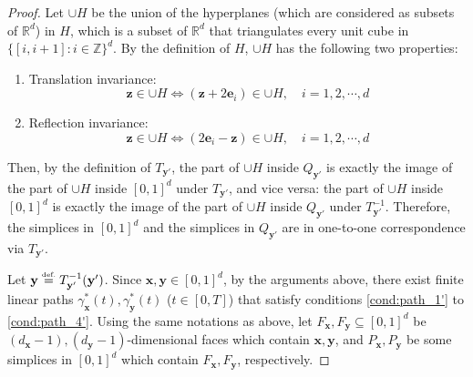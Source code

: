 \documentclass{article}
\numberwithin{equation}{section}
\theoremstyle{definition}
\newcommand{\eqdef}{\ensuremath{\stackrel{\mbox{\upshape\tiny def.}}{=}}}
\begin{document}
\begin{proof}
Let $\cup H$ be the union of the hyperplanes (which are considered as subsets of $\mathbb{R}^d$) in $H$, which is a subset of $\mathbb{R}^d$ that triangulates every unit cube in $\{[i,i+1]: i\in\mathbb{Z}\}^d$. By the definition of $H$, $\cup H$ has the following two properties:
\begin{enumerate}
    \item Translation invariance:
    $$\mathbf{z} \in \cup H \Longleftrightarrow
      (\mathbf{z} + 2\mathbf{e}_i) \in \cup H, 
      \quad i=1,2,\cdots,d$$
    \item Reflection invariance:
    $$\mathbf{z} \in \cup H \Longleftrightarrow
      (2\mathbf{e}_i - \mathbf{z}) \in \cup H,
      \quad i=1,2,\cdots,d$$
\end{enumerate}
Then, by the definition of $T_{\mathbf{y}'}$, the part of $\cup H$ inside $Q_{\mathbf{y}'}$ is exactly the image of the part of $\cup H$ inside $[0,1]^d$ under $T_{\mathbf{y}'}$, and vice versa: the part of $\cup H$ inside $[0,1]^d$ is exactly the image of the part of $\cup H$ inside $Q_{\mathbf{y}'}$ under $T_{\mathbf{y}'}^{-1}$. Therefore, the simplices in $[0,1]^d$ and the simplices in $Q_{\mathbf{y}'}$ are in one-to-one correspondence via $T_{\mathbf{y}'}$.

Let $\mathbf{y}  \eqdef  T_{\mathbf{y}'}^{-1}(\mathbf{y}')$. Since $\mathbf{x},\mathbf{y} \in [0,1]^d$, by the arguments above, there exist finite linear paths $\gamma_{\mathbf{x}}^{\ast}(t),\gamma_{\mathbf{y}}^{\ast}(t)$ ($t\in[0,T]$) that satisfy conditions \ref{cond:path_1'} to \ref{cond:path_4'}. Using the same notations as above, let $F_{\mathbf{x}},F_{\mathbf{y}}\subseteq[0,1]^d$ be $(d_{\mathbf{x}}-1),(d_{\mathbf{y}}-1)$-dimensional faces which contain $\mathbf{x},\mathbf{y}$, and $P_{\mathbf{x}},P_{\mathbf{y}}$ be some simplices in $[0,1]^d$ which contain $F_{\mathbf{x}},F_{\mathbf{y}}$, respectively.


\end{proof}
\end{document}
